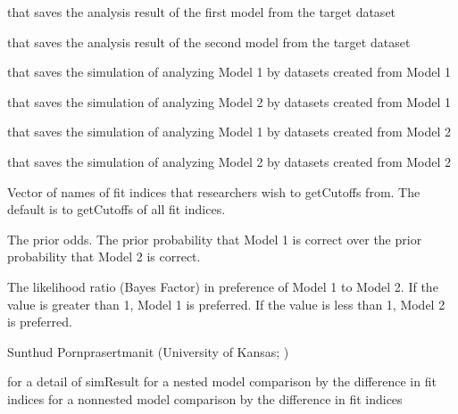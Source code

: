 \documentclass[a4paper]{book}
\begin{document}
\begin{Arguments}
\begin{ldescription}
\item[\code{outMod1}] 
 that saves the analysis result of the first model from the target dataset

\item[\code{outMod2}] 
 that saves the analysis result of the second model from the target dataset

\item[\code{dat1Mod1}] 
 that saves the simulation of analyzing Model 1 by datasets created from Model 1

\item[\code{dat1Mod2}] 
 that saves the simulation of analyzing Model 2 by datasets created from Model 1

\item[\code{dat2Mod1}] 
 that saves the simulation of analyzing Model 1 by datasets created from Model 2

\item[\code{dat2Mod2}] 
 that saves the simulation of analyzing Model 2 by datasets created from Model 2

\item[\code{usedFit}] 
Vector of names of fit indices that researchers wish to getCutoffs from. The default is to getCutoffs of all fit indices.

\item[\code{prior}] 
The prior odds. The prior probability that Model 1 is correct over the prior probability that Model 2 is correct.

\end{ldescription}
\end{Arguments}
%
\begin{Value}
The likelihood ratio (Bayes Factor) in preference of Model 1 to Model 2. If the value is greater than 1, Model 1 is preferred. If the value is less than 1, Model 2 is preferred.
\end{Value}
%
\begin{Author}\relax
Sunthud Pornprasertmanit (University of Kansas; )
\end{Author}
%
\begin{SeeAlso}\relax
{} for a detail of simResult
 for a nested model comparison by the difference in fit indices
 for a nonnested model comparison by the difference in fit indices
\end{SeeAlso}
\end{document}
